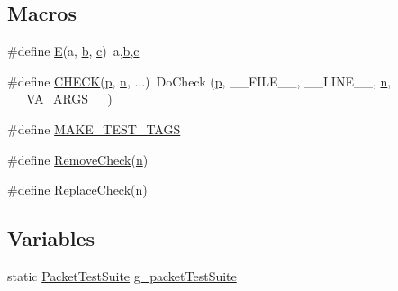 \subsection*{Macros}
\begin{DoxyCompactItemize}
\item 
\#define \hyperlink{packet-test-suite_8cc_a171669980e29849aa5e3722d573181ee}{E}(a,  \hyperlink{lte__pathloss_8m_a21ad0bd836b90d08f4cf640b4c298e7c}{b},  \hyperlink{mmwave_2model_2fading-traces_2fading__trace__generator_8m_ae0323a9039add2978bf5b49550572c7c}{c})~a,\hyperlink{lte__pathloss_8m_a21ad0bd836b90d08f4cf640b4c298e7c}{b},\hyperlink{mmwave_2model_2fading-traces_2fading__trace__generator_8m_ae0323a9039add2978bf5b49550572c7c}{c}
\item 
\#define \hyperlink{packet-test-suite_8cc_a11af326b9297affa78c47b78c80f8a44}{C\+H\+E\+CK}(\hyperlink{lte__link__budget__x2__handover__measures_8m_ac9de518908a968428863f829398a4e62}{p},  \hyperlink{lte__link__budget__x2__handover__measures_8m_abdb05bc5a064cf642a06c83b3392f148}{n}, ...)~Do\+Check (\hyperlink{lte__link__budget__x2__handover__measures_8m_ac9de518908a968428863f829398a4e62}{p}, \+\_\+\+\_\+\+F\+I\+L\+E\+\_\+\+\_\+, \+\_\+\+\_\+\+L\+I\+N\+E\+\_\+\+\_\+, \hyperlink{lte__link__budget__x2__handover__measures_8m_abdb05bc5a064cf642a06c83b3392f148}{n}, \+\_\+\+\_\+\+V\+A\+\_\+\+A\+R\+G\+S\+\_\+\+\_\+)
\item 
\#define \hyperlink{packet-test-suite_8cc_ac630f651835927fe9f983c73b24a0b5c}{M\+A\+K\+E\+\_\+\+T\+E\+S\+T\+\_\+\+T\+A\+GS}
\item 
\#define \hyperlink{packet-test-suite_8cc_aaba610d23c4d67308f432da03a0b6a5b}{Remove\+Check}(\hyperlink{lte__link__budget__x2__handover__measures_8m_abdb05bc5a064cf642a06c83b3392f148}{n})
\item 
\#define \hyperlink{packet-test-suite_8cc_a2e90eb18389e2d7573362f85fa11452c}{Replace\+Check}(\hyperlink{lte__link__budget__x2__handover__measures_8m_abdb05bc5a064cf642a06c83b3392f148}{n})
\end{DoxyCompactItemize}
\subsection*{Variables}
\begin{DoxyCompactItemize}
\item 
static \hyperlink{classPacketTestSuite}{Packet\+Test\+Suite} \hyperlink{packet-test-suite_8cc_a0e634be59945edf278701fdc923fca07}{g\+\_\+packet\+Test\+Suite}
\end{DoxyCompactItemize}


